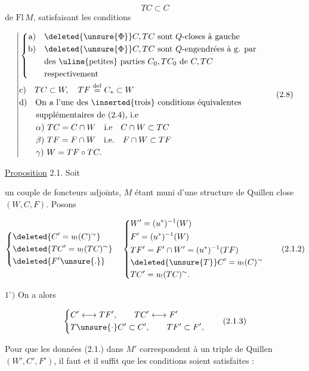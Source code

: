 \[
TC\subset C\tag*{(2.7)}
\]
de $\mathrm{Fl}\,M$, satisfaisant les conditions

\[
\left|\begin{aligned}
&\left\{\begin{aligned}
\text{a)}\quad &\deleted{\unsure{\Phi}}C,TC\text{ sont }Q\text{-closes à gauche}\\
\text{b)}\quad &\deleted{\unsure{\Phi}}C,TC\text{ sont }Q\text{-engendrées à g. par}\\
&\text{des \uline{petites} parties } C_0,TC_0\text{ de }C,TC\\
&\text{respectivement}
\end{aligned}\right.\\
&\text{c)}\quad TC\subset W,\quad TF\overset{\mathrm{def}}{=}C_*\subset W\\
&\text{d)}\quad\text{On a l'une des \inserted{trois} conditions équivalentes}\\
&\qquad\text{supplémentaires de (2.4), i.e}\\
&\qquad\alpha)\ TC=C\cap W\quad\text{i.e}\quad C\cap W\subset TC\\
&\qquad\beta)\ TF=F\cap W\quad\text{i.e.}\quad F\cap W\subset TF\\
&\qquad\gamma)\ W=TF\circ TC.
\end{aligned}\right.\tag*{(2.8)}
\]

\uline{Proposition} 2.1. Soit


un couple de foncteurs adjoints, $M$ étant
muni d'une structure de Quillen close
$(W,C,F)$. Posons

\[
\left\{\begin{aligned}
&\deleted{C'=u_!(C)^{\sim}}\\
&\deleted{TC'=u_!(TC)^{\sim}}\\
&\deleted{F'\unsure{.}}
\end{aligned}\right.\quad
\left\{\begin{aligned}
&W'=(u^*)^{-1}(W)\\
&F'=(u^*)^{-1}(W)\\
&TF'=F'\cap W'=(u^*)^{-1}(TF)\\
&\deleted{\unsure{T}}C'=u_!(C)^{\sim}\\
&TC'=u_!(TC)^{\sim}.
\end{aligned}\right.\tag*{(2.1.2)}
\]

$1^\circ)$ On a alors

\[
\left\{\begin{aligned}
&C'\longleftrightarrow TF',\qquad TC'\longleftrightarrow F'\\
&T\unsure{\cdot} C'\subset C',\qquad TF'\subset F',
\end{aligned}\right.\tag*{(2.1.3)}
\]

Pour que les données (2.1.) dans $M'$ \unsure{//|))} correspondent à un triple de Quillen $(W',C',F')$, il
faut et il suffit que les conditions 
soient satisfaites :
